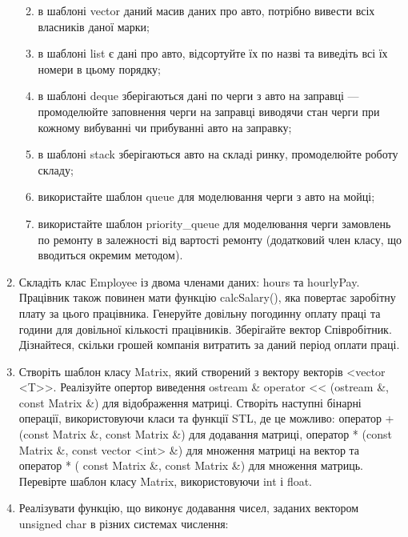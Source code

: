 \documentclass[]{article}
\begin{document}
\begin{enumerate}
  \begin{enumerate}
  \def\labelenumii{\arabic{enumii}.}
  \item
    в шаблоні vector даний масив даних про авто, потрібно вивести всіх
    власників даної марки;
  \item
    в шаблоні list є дані про авто, відсортуйте їх по назві та виведіть
    всі їх номери в цьому порядку;
  \item
    в шаблоні deque зберігаються дані по черги з авто на заправці ---
    промоделюйте заповнення черги на заправці виводячи стан черги при
    кожному вибуванні чи прибуванні авто на заправку;
  \item
    в шаблоні stack зберігаються авто на складі ринку, промоделюйте
    роботу складу;
  \item
    використайте шаблон queue для моделювання черги з авто на мойці;
  \item
    використайте шаблон priority\_queue для моделювання черги замовлень
    по ремонту в залежності від вартості ремонту (додатковий член класу,
    що вводиться окремим методом).
  \end{enumerate}
\item
  Складіть клас Employee із двома членами даних: hours та hourlyPay.
  Працівник також повинен мати функцію calcSalary(), яка повертає
  заробітну плату за цього працівника. Генеруйте довільну погодинну
  оплату праці та години для довільної кількості працівників. Зберігайте
  вектор Співробітник. Дізнайтеся, скільки грошей компанія витратить за
  даний період оплати праці.
\item
  Створіть шаблон класу Matrix, який створений з вектору векторів
  \textless{}vector \textless{}T\textgreater{}\textgreater{}. Реалізуйте
  опертор виведення ostream \& operator \textless{}\textless{} (ostream
  \&, const Matrix \&) для відображення матриці. Створіть наступні
  бінарні операції, використовуючи класи та функції STL, де це можливо:
  оператор + (const Matrix \&, const Matrix \&) для додавання матриці,
  оператор * (const Matrix \&, const vector \textless{}int\textgreater{}
  \&) для множення матриці на вектор та оператор * ( const Matrix \&,
  const Matrix \&) для множення матриць. Перевірте шаблон класу Matrix,
  використовуючи int і float.
\item
  Реалізувати функцію, що виконує додавання чисел, заданих вектором
  unsigned char в різних системах числення:
\end{enumerate}
\end{document}
